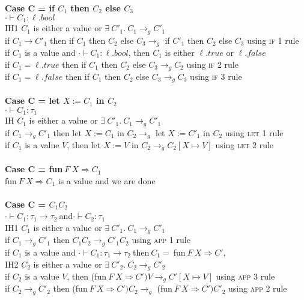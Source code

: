 \documentclass{article}
\begin{document}
\textbf{Case C = if $C_1$ then $C_2$ else $C_3$} \\
$\cdot \vdash C_1: \ell.bool$\\
IH1 $C_1$ is either a value or $  \exists \ C'_1.\ C_1 \to_g C'_1 $ \\
if $C_1 \to C'_1$ then if $C_1$ then $C_2$ else $C_3 \to_g $ if $C'_1$ then $C_2$ else $C_3$ using \textsc{if 1} rule\\
if $C_1$ is a value and $\cdot \vdash C_1: \ell.bool$, then $C_1$ is either $\ell.true$ or $\ell.false$ \\
if $C_1 = \ell.true$ then if $C_1$ then $C_2$ else $C_3 \to_g C_2$ using \textsc{if 2} rule\\
if $C_1 = \ell.false$ then if $C_1$ then $C_2$ else $C_3 \to_g C_3$ using \textsc{if 3} rule\\
\\
\textbf{Case C = let $X := C_1$ in $C_2$} \\
$\cdot \vdash C_1: \tau_1$\\
IH $C_1$ is either a value or $  \exists \ C'_1.\ C_1 \to_g C'_1 $ \\
if $C_1 \to_g C'_1$ then let $X := C_1$ in $C_2 \to_g $ let $X := C'_1$ in $C_2$ using \textsc{let 1} rule\\
if $C_1$ is a value $V$, then let $X := V$ in $C_2 \to_g C_2[X \mapsto V]$ using \textsc{let 2} rule
\\ \\
\textbf{Case C = fun$\ F\ X \Rightarrow C_1$ } \\
fun$\ F\ X \Rightarrow C_1$ is a value and we are done 
\\\\
\textbf{Case C = $C_1 C_2$} \\
$\cdot \vdash C_1: \tau_1 \to \tau_2\ $and$\cdot \vdash C_2: \tau_1$\\
IH1 $C_1$ is either a value or $  \exists \ C'_1.\ C_1 \to_g C'_1 $ \\
if $C_1 \to_g C'_1$ then $C_1 C_2 \to_g C'_1 C_2$ using \textsc{app 1} rule\\
if $C_1$ is a value and $\cdot \vdash C_1: \tau_1 \to \tau_2\ $then$\ C_1 =\ $fun$\ F\ X \Rightarrow C'$,\\
IH2 $C_2$ is either a value or $  \exists \ C'_2.\ C_2 \to_g C'_2 $ \\
if $C_2$ is a value $V$, then (fun$\ F\ X \Rightarrow C') V \to_g C'[X \mapsto V]$ using \textsc{app 3} rule \\
if $C_2 \to_g C'_2$ then (fun$\ F\ X \Rightarrow C') C_2 \to_g$ (fun$\ F\ X \Rightarrow C') C'_2$ using \textsc{app 2} rule 
\end{document}
